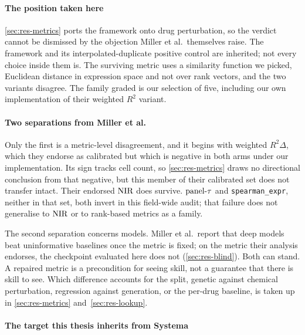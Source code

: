 \paragraph{The position taken here}
\cref{sec:res-metrics} ports the \DRF{} framework onto drug perturbation, so the
verdict cannot be dismissed by the objection Miller et al.\ themselves raise. The
framework and its interpolated-duplicate positive control are inherited; not
every choice inside them is. The surviving metric uses a similarity function we
picked, Euclidean distance in expression space and not over rank vectors, and the
two variants disagree. The family graded is our selection of five, including our
own implementation of their weighted $R^2$ variant.

\paragraph{Two separations from Miller et al.} Only the first is a metric-level
disagreement, and it begins with weighted $R^2\Delta$, which
they endorse as calibrated but which is negative in both arms under our
implementation. Its sign tracks cell count, so \cref{sec:res-metrics} draws no
directional conclusion from that negative, but this member of their calibrated
set does not transfer intact. Their endorsed $\textrm{NIR}$ does survive. $\textrm{panel-}\tau$ and
\texttt{spearman\_expr}, neither in that set, both invert in this field-wide
audit; that failure does not generalise to $\textrm{NIR}$ or to rank-based metrics as a
family.

The second separation concerns models. Miller et al.\ report that deep models
beat uninformative baselines once the metric is fixed; on the metric their
analysis endorses, the checkpoint evaluated here does not
(\cref{sec:res-blind}). Both can stand. A repaired metric is a precondition for
seeing skill, not a guarantee that there is skill to see. Which difference
accounts for the split, genetic against chemical perturbation, regression against
generation, or the per-drug baseline, is taken up in \cref{sec:res-metrics}
and~\cref{sec:res-lookup}.

\paragraph{The target this thesis inherits from Systema} 

